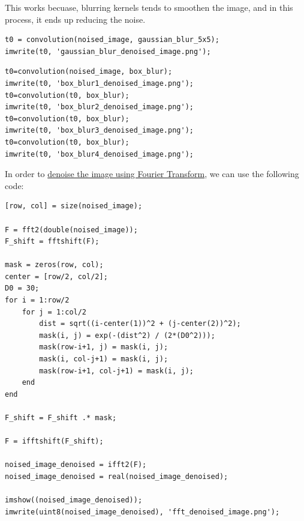 \documentclass[12pt]{report}
\begin{document}
This works becuase, blurring kernels tends to smoothen the image, and in this process, it ends up reducing the noise.

\begin{lstlisting}
t0 = convolution(noised_image, gaussian_blur_5x5);
imwrite(t0, 'gaussian_blur_denoised_image.png');
\end{lstlisting}

\begin{lstlisting}
t0=convolution(noised_image, box_blur);
imwrite(t0, 'box_blur1_denoised_image.png');
t0=convolution(t0, box_blur);
imwrite(t0, 'box_blur2_denoised_image.png');
t0=convolution(t0, box_blur);
imwrite(t0, 'box_blur3_denoised_image.png');
t0=convolution(t0, box_blur);
imwrite(t0, 'box_blur4_denoised_image.png');
\end{lstlisting}

In order to \href{https://mathematica.stackexchange.com/questions/110914/how-to-use-2d-fourier-analysis-to-clean-the-noise-in-an-image}{denoise the image using Fourier Transform}, we can use the following code:

\begin{lstlisting}
[row, col] = size(noised_image);

F = fft2(double(noised_image));
F_shift = fftshift(F);

mask = zeros(row, col);
center = [row/2, col/2];
D0 = 30;
for i = 1:row/2
    for j = 1:col/2
        dist = sqrt((i-center(1))^2 + (j-center(2))^2);
        mask(i, j) = exp(-(dist^2) / (2*(D0^2)));
        mask(row-i+1, j) = mask(i, j);
        mask(i, col-j+1) = mask(i, j);
        mask(row-i+1, col-j+1) = mask(i, j);
    end
end

F_shift = F_shift .* mask;

F = ifftshift(F_shift);

noised_image_denoised = ifft2(F);
noised_image_denoised = real(noised_image_denoised);

imshow((noised_image_denoised));
imwrite(uint8(noised_image_denoised), 'fft_denoised_image.png');
\end{lstlisting}
\end{document}

